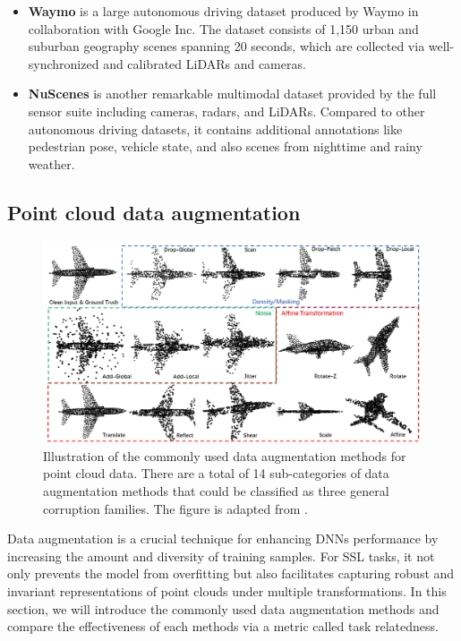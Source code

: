 \documentclass[a4paper,fleqn]{cas-dc}
\begin{document}
\begin{itemize}
    \item \textbf{Waymo} \citep{sun2020scalability} is a large autonomous driving dataset produced by Waymo in collaboration with Google Inc. The dataset consists of 1,150 urban and suburban geography scenes spanning 20 seconds, which are collected via well-synchronized and calibrated LiDARs and cameras.
    \item \textbf{NuScenes} \citep{caesar2020nuscenes} is another remarkable multimodal dataset provided by the full sensor suite including cameras, radars, and LiDARs. Compared to other autonomous driving datasets, it contains additional annotations like pedestrian pose, vehicle state, and also scenes from nighttime and rainy weather.
\end{itemize}


\subsection{Point cloud data augmentation}\label{sec:augmentation}

\begin{figure}
    \centering
    \includegraphics[width=0.97\linewidth]{corruptions_families.png}
    \caption{Illustration of the commonly used data augmentation methods for point cloud data. There are a total of 14 sub-categories of data augmentation methods that could be classified as three general corruption families. The figure is adapted from \citep{zhang2022point}.}
    \label{fig:augmentation}
\end{figure}

Data augmentation is a crucial technique for enhancing DNNs performance by increasing the amount and diversity of training samples. For SSL tasks, it not only prevents the model from overfitting but also facilitates capturing robust and invariant representations of point clouds under multiple transformations. In this section, we will introduce the commonly used data augmentation methods and compare the effectiveness of each methods via a metric called task relatedness.
\end{document}
